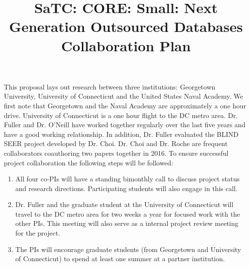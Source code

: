\documentclass[11pt]{article}
\begin{document}
\title{SaTC: CORE: Small: Next Generation Outsourced Databases \\Collaboration Plan}

\maketitle

This proposal lays out research between three institutions: Georgetown University, University of Connecticut and the United States Naval Academy.  We first note that Georgetown and the Naval Academy are approximately a one hour drive.  University of Connecticut is a one hour flight to the DC metro area. Dr. Fuller and Dr. O'Neill have worked together regularly over the last five years and have a good working relationship.  In addition, Dr. Fuller evaluated the BLIND SEER project developed by Dr. Choi.  Dr. Choi and Dr. Roche are frequent collaborators coauthoring two papers together in 2016.  To ensure successful project collaboration the following steps will be followed:

\begin{enumerate}
\item All four co-PIs will have a standing bimonthly call to discuss project status and research directions.  Participating students will also engage in this call.
\item Dr. Fuller and the graduate student at the University of Connecticut will travel to the DC metro area for two weeks a year for focused work with the other PIs.  This meeting will also serve as a internal project review meeting for the project.
\item The PIs will encourage graduate students (from Georgetown and University of Connecticut) to spend at least one summer at a partner institution.
\end{enumerate}
\end{document}
